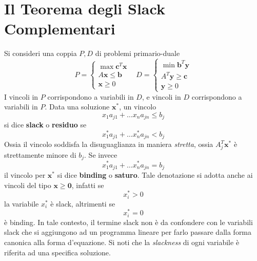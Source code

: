 \documentclass[10pt, letterpaper]{report}
\newcommand{\x}{{\mathbf{x}}}
\begin{document}
\section{Il Teorema degli Slack Complementari}
Si consideri una coppia $P,D$ di problemi primario-duale\begin{equation}\label{PD}
P=\begin{cases}
    \max \mathbf c^T\mathbf x\\ 
    A\mathbf x \le \mathbf b \\ 
    \mathbf x \ge 0 
\end{cases} \ \ \ \ D=
\begin{cases}
    \min \mathbf b^T\mathbf y\\ 
    A^T\mathbf y \ge \mathbf c \\ 
    \mathbf y \ge 0 
\end{cases}\end{equation}
I vincoli in $P$ corrispondono a variabili in $D$, e vincoli in $D$ corrispondono a variabili in $P$. Data una soluzione $\x^*$, un vincolo 
$$ x_1a_{j1}+\dots x_na_{jn}\le b_j$$
si dice \textbf{slack} o \textbf{residuo} se 
$$ x^*_1a_{j1}+\dots x^*_na_{jn}< b_j$$
Ossia il vincolo soddisfa la disuguaglianza in maniera \textit{stretta}, ossia $A_j^T\x^*$ è strettamente minore di $b_j$. Se invece 
$$ x^*_1a_{j1}+\dots x^*_na_{jn} = b_j$$
il vincolo per $\x^*$ si dice \textbf{binding} o \textbf{saturo}. Tale denotazione si adotta anche ai vincoli del tipo $\x\ge \mathbf 0$, infatti se 
$$ x^*_i>0$$
la variabile $x_i^*$ è slack, altrimenti se 
$$ x^*_i=0$$
è binding. In tale contesto, il termine slack non è da confondere con le variabili slack che si aggiungono ad un programma lineare per farlo passare dalla forma canonica alla forma d'equazione. Si noti che la \textit{slackness} di ogni variabile è riferita ad una specifica soluzione.\bigskip 
\end{document}
